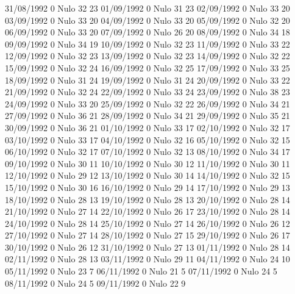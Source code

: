 31/08/1992  0     Nulo    32     23 
01/09/1992  0     Nulo    31     23 
02/09/1992  0     Nulo    33     20 
03/09/1992  0     Nulo    33     20 
04/09/1992  0     Nulo    33     20 
05/09/1992  0     Nulo    32     20 
06/09/1992  0     Nulo    33     20 
07/09/1992  0     Nulo    26     20 
08/09/1992  0     Nulo    34     18 
09/09/1992  0     Nulo    34     19 
10/09/1992  0     Nulo    32     23 
11/09/1992  0     Nulo    33     22 
12/09/1992  0     Nulo    32     23 
13/09/1992  0     Nulo    32     23 
14/09/1992  0     Nulo    32     22 
15/09/1992  0     Nulo    32     24 
16/09/1992  0     Nulo    32     25 
17/09/1992  0     Nulo    33     25 
18/09/1992  0     Nulo    31     24 
19/09/1992  0     Nulo    31     24 
20/09/1992  0     Nulo    33     22 
21/09/1992  0     Nulo    32     24 
22/09/1992  0     Nulo    33     24 
23/09/1992  0     Nulo    38     23 
24/09/1992  0     Nulo    33     20 
25/09/1992  0     Nulo    32     22 
26/09/1992  0     Nulo    34     21 
27/09/1992  0     Nulo    36     21 
28/09/1992  0     Nulo    34     21 
29/09/1992  0     Nulo    35     21 
30/09/1992  0     Nulo    36     21 
01/10/1992  0     Nulo    33     17 
02/10/1992  0     Nulo    32     17 
03/10/1992  0     Nulo    33     17 
04/10/1992  0     Nulo    32     16 
05/10/1992  0     Nulo    32     15 
06/10/1992  0     Nulo    32     17 
07/10/1992  0     Nulo    32     13 
08/10/1992  0     Nulo    34     17 
09/10/1992  0     Nulo    30     11 
10/10/1992  0     Nulo    30     12 
11/10/1992  0     Nulo    30     11 
12/10/1992  0     Nulo    29     12 
13/10/1992  0     Nulo    30     14 
14/10/1992  0     Nulo    32     15 
15/10/1992  0     Nulo    30     16 
16/10/1992  0     Nulo    29     14 
17/10/1992  0     Nulo    29     13 
18/10/1992  0     Nulo    28     13 
19/10/1992  0     Nulo    28     13 
20/10/1992  0     Nulo    28     14 
21/10/1992  0     Nulo    27     14 
22/10/1992  0     Nulo    26     17 
23/10/1992  0     Nulo    28     14 
24/10/1992  0     Nulo    28     14 
25/10/1992  0     Nulo    27     14 
26/10/1992  0     Nulo    26     12 
27/10/1992  0     Nulo    27     14 
28/10/1992  0     Nulo    27     15 
29/10/1992  0     Nulo    26     17 
30/10/1992  0     Nulo    26     12 
31/10/1992  0     Nulo    27     13 
01/11/1992  0     Nulo    28     14 
02/11/1992  0     Nulo    28     13 
03/11/1992  0     Nulo    29     11 
04/11/1992  0     Nulo    24     10 
05/11/1992  0     Nulo    23     7 
06/11/1992  0     Nulo    21     5 
07/11/1992  0     Nulo    24     5 
08/11/1992  0     Nulo    24     5 
09/11/1992  0     Nulo    22     9 

